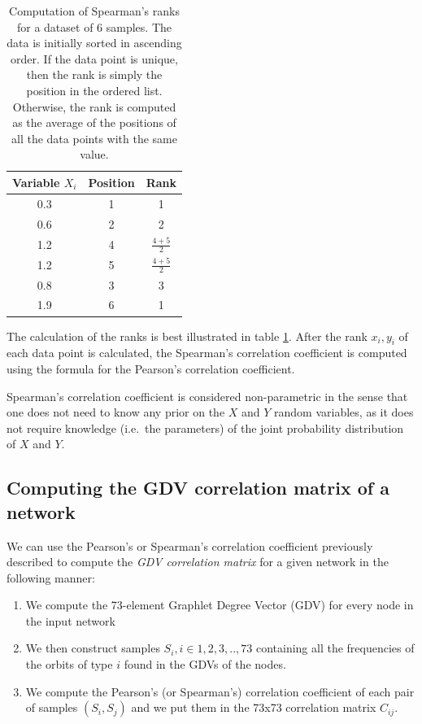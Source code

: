 
\begin{table}
  \centering
  \begin{tabular}{ | c | c | c |}
    \hline
    \cellcolor{blue3} Variable $X_i$ & \cellcolor{blue3} Position & \cellcolor{blue3} Rank\\
    \hline
    0.3 & 1 & 1\\
    \hline
    0.6 & 2 & 2\\
    \hline
    1.2 & 4 & $ \frac{4+5}{2} $\\
    \hline
    1.2 & 5 & $ \frac{4+5}{2} $\\
    \hline
    0.8 & 3 & 3\\
    \hline
    1.9 & 6 & 1\\
    \hline
  \end{tabular}
  \caption{Computation of Spearman's ranks for a dataset of 6 samples. The data is initially sorted in ascending order. If the data point is
unique, then the rank is simply the position in the ordered list. Otherwise,
the rank is computed as the average of the positions of all the data points
with the same value.}
  \label{tab:ranks_table}
\end{table}

The calculation of the ranks is best illustrated in table \ref{tab:ranks_table}.
After the rank $ x_i, y_i $ of each data point is calculated,
the Spearman's correlation coefficient is computed using the formula for the Pearson's
correlation coefficient.


Spearman's correlation coefficient is considered non-parametric in the sense
that one does not need to know any prior on the $X$ and $Y$ random variables, as
it does not require knowledge (i.e.\ the parameters) of the joint probability
distribution of $X$ and $Y$.

\subsection{Computing the GDV correlation matrix of a network}
\label{pearsons_background}

We can use the Pearson's or Spearman's correlation coefficient previously
described to compute the \emph{GDV correlation matrix} for a given network in the
following manner:
\begin{enumerate}
 \item We compute the 73-element Graphlet Degree Vector (GDV) for every node in the
input network
 \item We then construct samples $ S_i, i\in {1,2,3, .. ,73} $
containing all the frequencies of the orbits of type $i$ found in the GDVs of
the nodes.
 \item We compute the Pearson's (or Spearman's) correlation coefficient of each
pair of samples $ (S_i, S_j) $ and we put them in the 73x73 correlation matrix $
C_{ij} $.
\end{enumerate}

